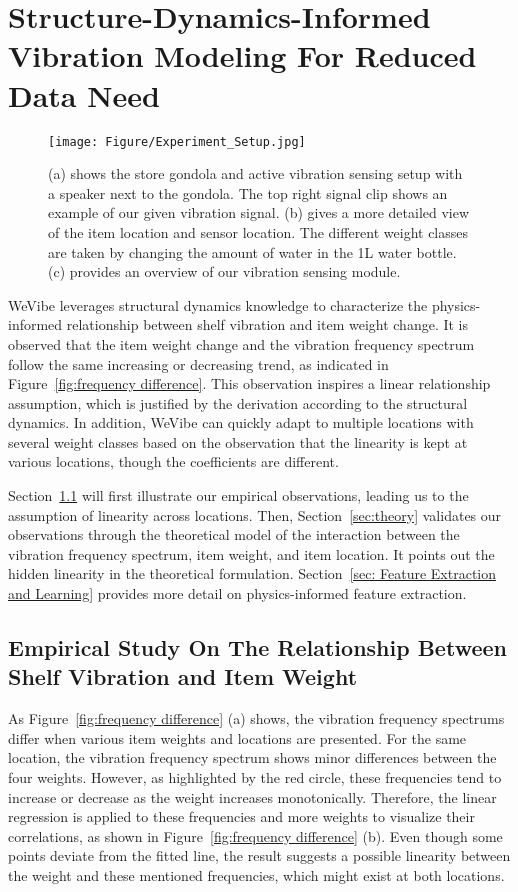 \section{Structure-Dynamics-Informed Vibration Modeling For Reduced Data Need}
\label{sec:Structure-dynamics-informed modeling}

\begin{figure*}[t]
    \centering
    \texttt{[image: Figure/Experiment\_Setup.jpg]}
    \caption{(a) shows the store gondola and active vibration sensing setup with a speaker next to the gondola. The top right signal clip shows an example of our given vibration signal. (b) gives a more detailed view of the item location and sensor location. The different weight classes are taken by changing the amount of water in the 1L water bottle. (c) provides an overview of our vibration sensing module.}
    \label{fig:Experiment Setup}
\end{figure*}

WeVibe leverages structural dynamics knowledge to characterize the physics-informed relationship between shelf vibration and item weight change. It is observed that the item weight change and the vibration frequency spectrum follow the same increasing or decreasing trend, as indicated in Figure~\ref{fig:frequency difference}. This observation inspires a linear relationship assumption, which is justified by the derivation according to the structural dynamics. In addition, WeVibe can quickly adapt to multiple locations with several weight classes based on the observation that the linearity is kept at various locations, though the coefficients are different.

Section~\ref{sec:empirical study} will first illustrate our empirical observations, leading us to the assumption of linearity across locations. Then, Section~\ref{sec:theory} validates our observations through the theoretical model of the interaction between the vibration frequency spectrum, item weight, and item location. It points out the hidden linearity in the theoretical formulation. Section~\ref{sec: Feature Extraction and Learning} provides more detail on physics-informed feature extraction.


\subsection{Empirical Study On The Relationship Between Shelf Vibration and Item Weight}
\label{sec:empirical study}
As Figure~\ref{fig:frequency difference} (a) shows, the vibration frequency spectrums differ when various item weights and locations are presented. For the same location, the vibration frequency spectrum shows minor differences between the four weights. However, as highlighted by the red circle, these frequencies tend to increase or decrease as the weight increases monotonically. Therefore, the linear regression is applied to these frequencies and more weights to visualize their correlations, as shown in Figure~\ref{fig:frequency difference} (b). Even though some points deviate from the fitted line, the result suggests a possible linearity between the weight and these mentioned frequencies, which might exist at both locations. 

